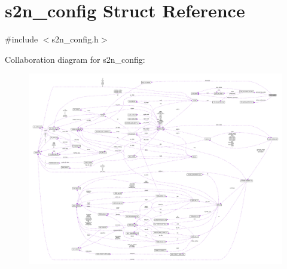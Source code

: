 \hypertarget{structs2n__config}{}\section{s2n\+\_\+config Struct Reference}
\label{structs2n__config}


{\ttfamily \#include $<$s2n\+\_\+config.\+h$>$}



Collaboration diagram for s2n\+\_\+config\+:\nopagebreak
\begin{figure}[H]
\begin{center}
\leavevmode
\includegraphics[width=350pt]{structs2n__config__coll__graph}
\end{center}
\end{figure}

